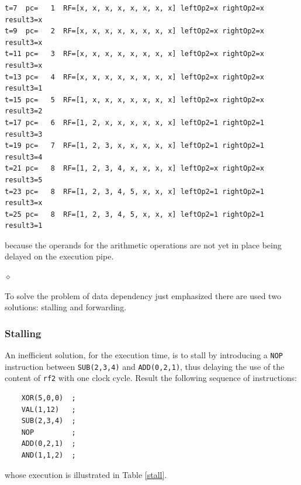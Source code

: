\begin{exemplu}
\begin{verbatim}
t=7  pc=   1  RF=[x, x, x, x, x, x, x, x] leftOp2=x rightOp2=x result3=x
t=9  pc=   2  RF=[x, x, x, x, x, x, x, x] leftOp2=x rightOp2=x result3=x
t=11 pc=   3  RF=[x, x, x, x, x, x, x, x] leftOp2=x rightOp2=x result3=x
t=13 pc=   4  RF=[x, x, x, x, x, x, x, x] leftOp2=x rightOp2=x result3=1
t=15 pc=   5  RF=[1, x, x, x, x, x, x, x] leftOp2=x rightOp2=x result3=2
t=17 pc=   6  RF=[1, 2, x, x, x, x, x, x] leftOp2=1 rightOp2=1 result3=3
t=19 pc=   7  RF=[1, 2, 3, x, x, x, x, x] leftOp2=1 rightOp2=1 result3=4
t=21 pc=   8  RF=[1, 2, 3, 4, x, x, x, x] leftOp2=x rightOp2=x result3=5
t=23 pc=   8  RF=[1, 2, 3, 4, 5, x, x, x] leftOp2=1 rightOp2=1 result3=x
t=25 pc=   8  RF=[1, 2, 3, 4, 5, x, x, x] leftOp2=1 rightOp2=1 result3=1
\end{verbatim}
because the operands for the arithmetic operations are not yet in place being delayed on the execution pipe.

$\diamond$
\end{exemplu}



To solve the problem of data dependency just emphasized there are used two solutions: stalling and forwarding.

\subsubsection{Stalling}

An inefficient solution, for the execution time, is to stall by introducing a {\tt NOP} instruction between {\tt SUB(2,3,4)} and {\tt ADD(0,2,1)}, thus delaying the use of the content of {\tt rf2} with one clock cycle. Result the following sequence of instructions:
\begin{verbatim}
    XOR(5,0,0)  ;
    VAL(1,12)   ;
    SUB(2,3,4)  ;
    NOP         ;
    ADD(0,2,1)  ;
    AND(1,1,2)  ;
\end{verbatim}
whose execution is illustrated in Table \ref{stall}.

